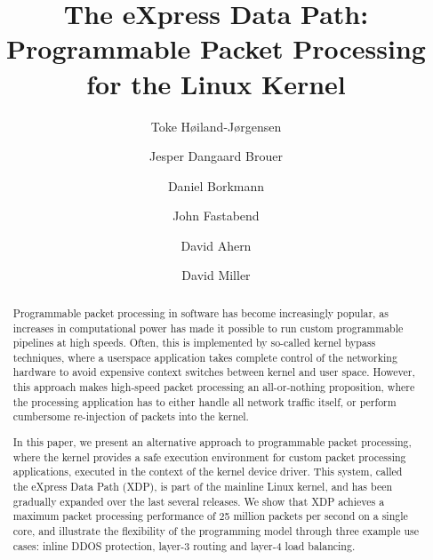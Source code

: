 \documentclass[10pt,sigconf]{acmart}
\begin{document}
\title{The eXpress Data Path: Programmable Packet Processing for the Linux Kernel}
\author{Toke Høiland-Jørgensen}

\author{Jesper Dangaard Brouer}

\author{Daniel Borkmann}

\author{John Fastabend}

\author{David Ahern}

\author{David Miller}

\renewcommand{\shortauthors}{T. Høiland-Jørgensen et al.}
\renewcommand{\shorttitle}{The eXpress Data Path}
\captionsetup{font+=small}



\begin{abstract}
  Programmable packet processing in software has become increasingly popular, as
  increases in computational power has made it possible to run custom
  programmable pipelines at high speeds. Often, this is implemented by so-called
  kernel bypass techniques, where a userspace application takes complete control
  of the networking hardware to avoid expensive context switches between kernel
  and user space. However, this approach makes high-speed packet processing an
  all-or-nothing proposition, where the processing application has to either
  handle all network traffic itself, or perform cumbersome re-injection of
  packets into the kernel.

  In this paper, we present an alternative approach to programmable packet
  processing, where the kernel provides a safe execution environment for custom
  packet processing applications, executed in the context of the kernel device
  driver. This system, called the eXpress Data Path (XDP), is part of the
  mainline Linux kernel, and has been gradually expanded over the last several
  releases. We show that XDP achieves a maximum packet processing performance of
  25 million packets per second on a single core, and illustrate the flexibility
  of the programming model through three example use cases: inline DDOS
  protection, layer-3 routing and layer-4 load balancing.
\end{abstract}
\end{document}
